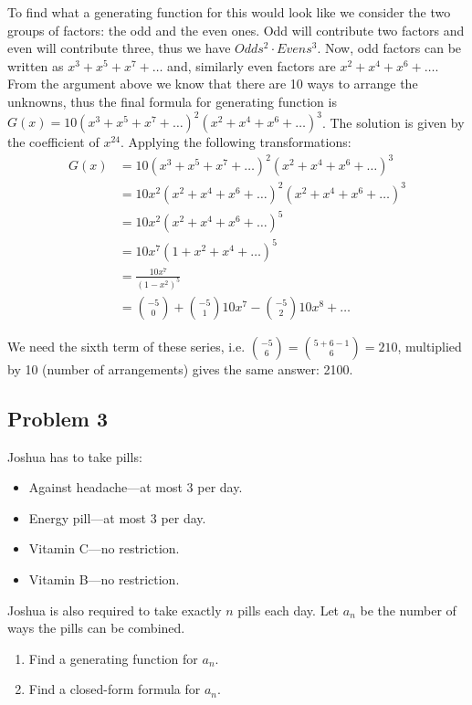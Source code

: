 \documentclass[11pt]{article}
\begin{document}
To find what a generating function for this would look like we consider the
two groups of factors: the odd and the even ones.  Odd will contribute two
factors and even will contribute three, thus we have \(Odds^2 \cdot Evens^3\).
Now, odd factors can be written as \(x^3 + x^5 + x^7 + \hdots\) and, similarly
even factors are \(x^2 + x^4 + x^6 + \hdots\).  From the argument above we
know that there are 10 ways to arrange the unknowns, thus the final formula
for generating function is \(G(x) = 10(x^3 + x^5 + x^7 + \hdots)^2 (x^2 + x^4 +
    x^6 + \hdots)^3\).  The solution is given by the coefficient of \(x^{24}\).
Applying the following transformations:
\begin{align*}
  G(x) &= 10(x^3 + x^5 + x^7 + \hdots)^2 (x^2 + x^4 + x^6 + \hdots)^3 \\
       &= 10x^2(x^2 + x^4 + x^6 + \hdots)^2 (x^2 + x^4 + x^6 + \hdots)^3 \\
       &= 10x^2(x^2 + x^4 + x^6 + \hdots)^5 \\
       &= 10x^7(1 + x^2 + x^4 + \hdots)^5 \\
       &= \frac{10x^7}{(1 - x^2)^5} \\
       &= {-5 \choose 0} + {-5 \choose 1}10x^7 - {-5 \choose 2}10x^8 + \hdots
\end{align*}

We need the sixth term of these series, i.e. \({-5 \choose 6} = {5 + 6 - 1
   \choose 6} = 210\), multiplied by 10 (number of arrangements) gives the same
answer: 2100.

\subsection{Problem 3}
\label{sec:orgheadline8}
Joshua has to take pills:
\begin{itemize}
\item Against headache---at most 3 per day.
\item Energy pill---at most 3 per day.
\item Vitamin C---no restriction.
\item Vitamin B---no restriction.
\end{itemize}

Joshua is also required to take exactly \(n\) pills each day.  Let \(a_n\)
be the number of ways the pills can be combined.

\begin{enumerate}
\item Find a generating function for \(a_n\).
\item Find a closed-form formula for \(a_n\).
\end{enumerate}
\end{document}
